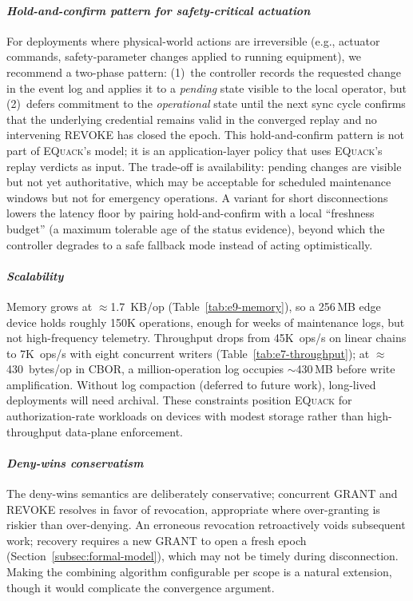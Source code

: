 \documentclass[10pt,journal,compsoc]{IEEEtran}
\newcommand{\equack}{\textsc{EQuack}}
\begin{document}
\paragraph*{\textit{Hold-and-confirm pattern for safety-critical actuation}}
For deployments where physical-world actions are irreversible (e.g., actuator commands, safety-parameter changes applied to running equipment), we recommend a two-phase pattern: (1)~the controller records the requested change in the event log and applies it to a \emph{pending} state visible to the local operator, but (2)~defers commitment to the \emph{operational} state until the next sync cycle confirms that the underlying credential remains valid in the converged replay and no intervening \textsc{REVOKE} has closed the epoch. This hold-and-confirm pattern is not part of \equack{}'s model; it is an application-layer policy that uses \equack{}'s replay verdicts as input. The trade-off is availability: pending changes are visible but not yet authoritative, which may be acceptable for scheduled maintenance windows but not for emergency operations. A variant for short disconnections lowers the latency floor by pairing hold-and-confirm with a local ``freshness budget'' (a maximum tolerable age of the status evidence), beyond which the controller degrades to a safe fallback mode instead of acting optimistically.

\paragraph*{\textit{Scalability}}
Memory grows at $\approx$1.7~KB/op (Table~\ref{tab:e9-memory}), so a 256\,MB edge device holds roughly 150K operations, enough for weeks of maintenance logs, but not high-frequency telemetry. Throughput drops from 45K~ops/s on linear chains to 7K~ops/s with eight concurrent writers (Table~\ref{tab:e7-throughput}); at $\approx$430~bytes/op in CBOR, a million-operation log occupies $\sim$430\,MB before write amplification. Without log compaction (deferred to future work), long-lived deployments will need archival. These constraints position \equack{} for authorization-rate workloads on devices with modest storage rather than high-throughput data-plane enforcement.

\paragraph*{\textit{Deny-wins conservatism}}
The deny-wins semantics are deliberately conservative; concurrent GRANT and REVOKE resolves in favor of revocation, appropriate where over-granting is riskier than over-denying. An erroneous revocation retroactively voids subsequent work; recovery requires a new GRANT to open a fresh epoch (Section~\ref{subsec:formal-model}), which may not be timely during disconnection. Making the combining algorithm configurable per scope is a natural extension, though it would complicate the convergence argument.
\end{document}
